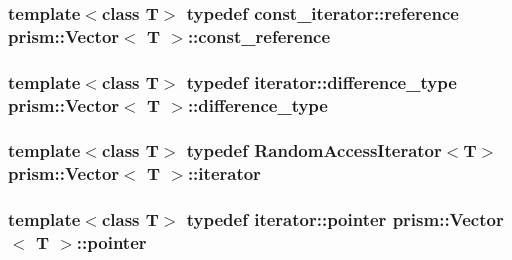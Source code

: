 \subsubsection[{\texorpdfstring{const\+\_\+reference}{const_reference}}]{\setlength{\rightskip}{0pt plus 5cm}template$<$class T$>$ typedef const\+\_\+iterator\+::reference {\bf prism\+::\+Vector}$<$ T $>$\+::{\bf const\+\_\+reference}}\hypertarget{classprism_1_1_vector_a75325487acaa0f63496c110e5a5632bb}{}\label{classprism_1_1_vector_a75325487acaa0f63496c110e5a5632bb}
\subsubsection[{\texorpdfstring{difference\+\_\+type}{difference_type}}]{\setlength{\rightskip}{0pt plus 5cm}template$<$class T$>$ typedef iterator\+::difference\+\_\+type {\bf prism\+::\+Vector}$<$ T $>$\+::{\bf difference\+\_\+type}}\hypertarget{classprism_1_1_vector_a5fe3b74bfb30d75aa74d4d896e6b7227}{}\label{classprism_1_1_vector_a5fe3b74bfb30d75aa74d4d896e6b7227}
\subsubsection[{\texorpdfstring{iterator}{iterator}}]{\setlength{\rightskip}{0pt plus 5cm}template$<$class T$>$ typedef Random\+Access\+Iterator$<$T$>$ {\bf prism\+::\+Vector}$<$ T $>$\+::{\bf iterator}}\hypertarget{classprism_1_1_vector_aa547779173a63f6f8c9b2887498d10eb}{}\label{classprism_1_1_vector_aa547779173a63f6f8c9b2887498d10eb}
\subsubsection[{\texorpdfstring{pointer}{pointer}}]{\setlength{\rightskip}{0pt plus 5cm}template$<$class T$>$ typedef iterator\+::pointer {\bf prism\+::\+Vector}$<$ T $>$\+::{\bf pointer}}\hypertarget{classprism_1_1_vector_a9823d64f361cdff3fcc5043e8b4bd882}{}\label{classprism_1_1_vector_a9823d64f361cdff3fcc5043e8b4bd882}
